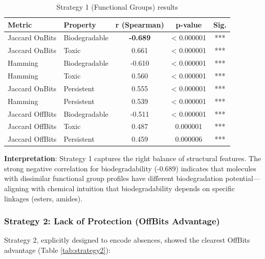 \documentclass[11pt,letterpaper]{article}
\begin{document}
\begin{table}[H]
\centering
\caption{Strategy 1 (Functional Groups) results}
\label{tab:strategy1}
\small
\begin{tabular}{llccc}
\toprule
\textbf{Metric} & \textbf{Property} & \textbf{r (Spearman)} & \textbf{p-value} & \textbf{Sig.} \\
\midrule
Jaccard OnBits & Biodegradable & \textbf{-0.689} & < 0.000001 & *** \\
Jaccard OnBits & Toxic & 0.661 & < 0.000001 & *** \\
Hamming & Biodegradable & -0.610 & < 0.000001 & *** \\
Hamming & Toxic & 0.560 & < 0.000001 & *** \\
Jaccard OnBits & Persistent & 0.555 & < 0.000001 & *** \\
Hamming & Persistent & 0.539 & < 0.000001 & *** \\
Jaccard OffBits & Biodegradable & -0.511 & < 0.000001 & *** \\
Jaccard OffBits & Toxic & 0.487 & 0.000001 & *** \\
Jaccard OffBits & Persistent & 0.459 & 0.000006 & *** \\
\bottomrule
\end{tabular}
\end{table}

\textbf{Interpretation}: Strategy 1 captures the right balance of structural features. The strong negative correlation for biodegradability (-0.689) indicates that molecules with dissimilar functional group profiles have different biodegradation potential—aligning with chemical intuition that biodegradability depends on specific linkages (esters, amides).

\subsubsection{Strategy 2: Lack of Protection (OffBits Advantage)}

Strategy 2, explicitly designed to encode absences, showed the clearest OffBits advantage (Table \ref{tab:strategy2}):
\end{document}
